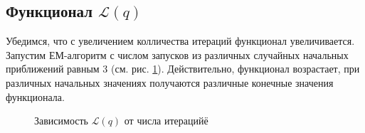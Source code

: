 \documentclass[twoside]{article}
\begin{document}
\subsection{Функционал 	$\mathcal{L}(q)$}
Убедимся, что с увеличением колличества итераций функционал увеличивается. Запустим ЕМ-алгоритм с числом запусков из различных случайных начальных приближений равным 3 (см. рис. \ref{fig:8}). Действительно, функционал возрастает, при различных начальных значениях получаются различные конечные значения функционала.

\begin{figure}[h!]
	\begin{center}
		\begin{minipage}[h]{0.49\linewidth}
		\end{minipage}
		\caption{Зависимость $\mathcal{L}(q)$ от числа итерацийё}
		\label{fig:8}
	\end{center}
\end{figure}
\end{document}
